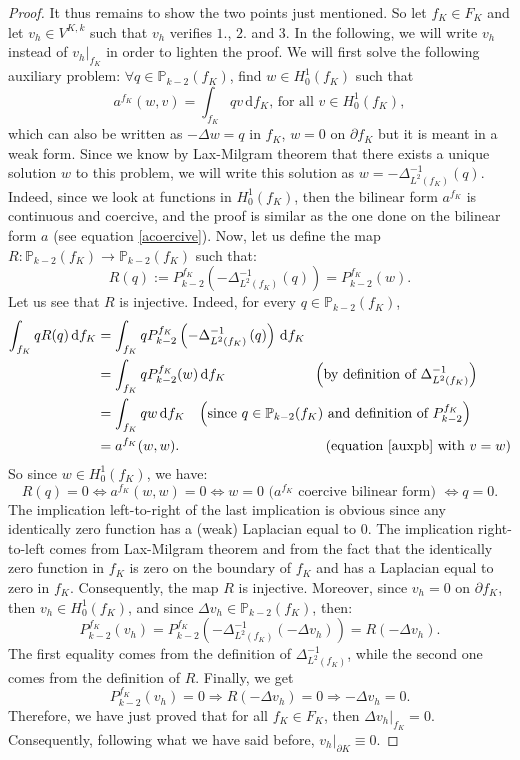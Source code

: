 \begin{proof}
It thus remains to show the two points just mentioned. So let $f_K\in F_K$ and let $v_h\in V^{K,k}$ such that $v_h$ verifies $1.$, $2.$ and $3.$ In the following, we will write $v_h$ instead of $v_h|_{f_K}$ in order to lighten the proof. We will first solve the following auxiliary problem: $\forall q\in \mathbb{P}_{k-2}(f_K)$, find $w\in H_0^1(f_K)$ such that \begin{equation}\label{auxpb}
a^{f_K}(w,v)=\int_{f_K}qv \,\mathrm{d}f_K\text{, for all } v\in H_0^1(f_K),
\end{equation}
which can also be written as $-\Delta w=q$ in $f_K$, $w=0$ on $\partial f_K$ but it is meant in a weak form. Since we know by Lax-Milgram theorem that there exists a unique solution $w$ to this problem, we will write this solution as $w=-\Delta_{L^2(f_K)}^{-1}(q)$. Indeed, since we look at functions in $H_0^1(f_K)$, then the bilinear form $a^{f_K}$ is continuous and coercive, and the proof is similar as the one done on the bilinear form $a$ (see equation \ref{acoercive}). Now, let us define the map $R:\mathbb{P}_{k-2}(f_K)\rightarrow\mathbb{P}_{k-2}(f_K)$ such that:
$$R(q) := P_{k-2}^{f_K}\left(-\Delta_{L^2(f_K)}^{-1}\left( q\right) \right)=P_{k-2}^{f_K}(w).$$
Let us see that $R$ is injective. Indeed, for every $q\in \mathbb{P}_{k-2}(f_K)$, 
\begin{align*}
\int_{f_K} qR(q)\, \mathrm{d}f_K &= \int_{f_K} qP_{k-2}^{f_K}\left(-\Delta_{L^2(f_K)}^{-1} \left(q\right)\right)\,\mathrm{d}f_K\\
&=\int_{f_K} qP_{k-2}^{f_K}(w)\, \mathrm{d}f_K \hspace{2.2cm}\left(\text{by definition of }\Delta_{L^2(f_K)}^{-1}\right)\\
&=\int_{f_K} qw\,\mathrm{d}{f_K}\hspace{0.3cm}\left(\text{since }q\in\mathbb{P}_{k-2}(f_K)\text{ and definition of }P_{k-2}^{f_K}\right)\\
&= a^{f_K}(w,w).\hspace{3.7cm} \text{(equation \ref{auxpb} with }v=w)
\end{align*}
So since $w\in H_0^1(f_K)$, we have:
$$R(q)=0 \Leftrightarrow a^{f_K}(w,w)=0 \Leftrightarrow w=0 \text{ (}a^{f_K}\text{ coercive bilinear form) }\Leftrightarrow q=0.$$
The implication left-to-right of the last implication is obvious since any identically zero function has a (weak) Laplacian equal to $0$. The implication right-to-left comes from Lax-Milgram theorem and from the fact that the identically zero function in $f_K$ is zero on the boundary of $f_K$ and has a Laplacian equal to zero in $f_K$. Consequently, the map $R$ is injective. 
Moreover, since $v_h=0$ on $\partial f_K$, then $v_h\in H_0^1(f_K)$, and since $\Delta v_h \in \mathbb{P}_{k-2}(f_K)$, then:
$$P_{k-2}^{f_K}(v_h)=P_{k-2}^{f_K}\left(-\Delta_{L^2(f_K)}^{-1}
\left(-\Delta v_h\right)\right) = R\left(-\Delta v_h\right).$$
The first equality comes from the definition of $\Delta_{L^2(f_K)}^{-1}$, while the second one comes from the definition of $R$. Finally, we get
$$P_{k-2}^{f_K}(v_h)=0 \Rightarrow R\left(-\Delta v_h\right) = 0 \Rightarrow -\Delta v_h = 0.$$
Therefore, we have just proved that for all $f_K\in F_K$, then $\Delta v_h|_{f_K}=0$. Consequently, following what we have said before, $v_h|_{\partial K} \equiv 0$. 


\end{proof}
